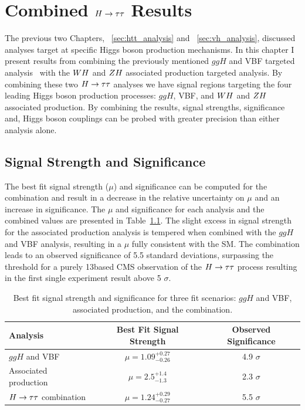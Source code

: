 \chapter{Combined $H\to\tau\tau$ Results}
\label{sec:cmb_results}

The previous two Chapters, ~\ref{sec:htt_analysis} and ~\ref{sec:vh_analysis}, discussed
analyses target at specific Higgs boson production mechanisms. In this chapter
I present results from combining the previously mentioned 
$ggH$ and VBF targeted analysis~\cite{cms_13TeV_htt_jhep_2017}
with the $WH$ and $ZH$ associated production targeted analysis.
By combining these two $H\to\tau\tau$ analyses we have signal regions targeting the four leading Higgs 
boson production processes: $ggH$, VBF, and $WH$ and $ZH$ associated production. 
By combining the results, signal strengths, significance and, Higgs
boson couplings can be probed with greater precision than either analysis alone.

\section{Signal Strength and Significance}
The best fit signal strength ($\mu$) and significance can be computed for the combination and
result in a decrease in the relative uncertainty on $\mu$ and an increase
in significance. The $\mu$ and significance
for each analysis and the combined values are presented in Table~\ref{tab:cmb_mu_and_sig}.
The slight excess in signal strength for the associated production analysis is tempered
when combined with the $ggH$ and VBF analysis, resulting in a $\mu$ fully consistent 
with the SM. The combination leads to an 
observed significance of 5.5 standard deviations, surpassing the threshold for a
purely 13\TeV based CMS observation of the $H\to\tau\tau$ process resulting in the first single
experiment result above 5 $\sigma$. 

\begin{table}[htbp]
\renewcommand{\arraystretch}{1.3}
\centering
\begin{tabular}{lcc}
Analysis         &   Best Fit Signal Strength    &   Observed Significance    \\
\hline
$ggH$ and VBF             &   $\mu = 1.09 ^{+0.27} _{-0.26}$   &  4.9 $\sigma$     \\
Associated production     &   $\mu = 2.5  ^{+1.4}  _{-1.3}$    &  2.3 $\sigma$     \\
$H\to\tau\tau$ combination        &   $\mu = 1.24 ^{+0.29} _{-0.27}$   &  5.5 $\sigma$     \\
\hline
\end{tabular}
\caption{
Best fit signal strength and significance for three fit scenarios: $ggH$ and VBF,
associated production, and the combination.
}
\label{tab:cmb_mu_and_sig}
\end{table}



